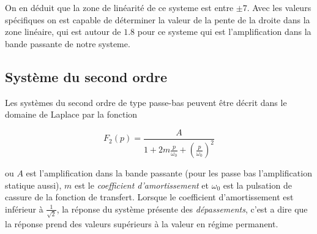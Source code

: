 \documentclass[12pt, a4paper]{report}
\begin{document}
On en déduit que la zone de linéarité de ce systeme est entre $\pm 7$. Avec les valeurs spécifiques on est capable de déterminer
la valeur de la pente de la droite dans la zone linéaire, qui est autour de $1.8$ pour ce systeme qui est l'amplification dans la bande passante de notre systeme.

\subsection{Système du second ordre}

Les systèmes du second ordre de type passe-bas peuvent être décrit dans le domaine de Laplace par 
la fonction

\[
  F_{2} (p) =   \frac{A}{1 + 2m \frac{p}{\omega_{0}} + \left( \frac{p}{\omega_{0}} \right)^2}
\]

ou $A$ est l'amplification dans la bande passante (pour les passe bas l'amplification statique aussi), 
$m$ est le \textit{coefficient d'amortissement} et $\omega_{0}$ est la pulsation de cassure de la fonction de 
transfert. Lorsque le coefficient d'amortissement est inférieur à $\frac{1}{\sqrt{2}}$, la réponse du système présente
des \textit{dépassements}, c'est a dire que la réponse prend des valeurs supérieurs à la valeur en régime permanent.
\end{document}

